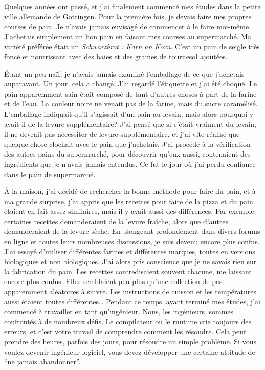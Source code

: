 Quelques années ont passé, et j'ai finalement commencé mes études dans la petite ville allemande de Göttingen.
Pour la première fois, je devais faire mes propres courses de pain. Je n'avais jamais
envisagé de commencer à le faire moi-même. J'achetais simplement
un bon pain en faisant mes courses au supermarché. Ma variété préférée
était un \emph{Schwarzbrot : Korn an Korn}. C'est un pain de seigle très foncé et nourrissant
avec des baies et des graines de tournesol ajoutées.

Étant un peu naïf, je n'avais jamais examiné l'emballage de ce que j'achetais
auparavant. Un jour, cela a changé. J'ai regardé l'étiquette et j'ai été choqué. Le
pain apparemment sain était composé de tant d'autres choses à part de la farine et de l'eau.
La couleur noire ne venait pas de la farine, mais du sucre caramélisé.
L'emballage indiquait qu'il s'agissait d'un pain au levain, mais alors pourquoi y avait-il de la levure supplémentaire?
J'ai pensé que si c'était vraiment du levain, il ne devrait pas nécessiter de levure supplémentaire, et j'ai vite
réalisé que quelque chose clochait avec le pain que j'achetais.
J'ai procédé à la vérification des autres pains du supermarché, pour découvrir qu'eux aussi,
contenaient des ingrédients que je n'avais jamais entendus. Ce fut le jour où j'ai perdu confiance
dans le pain de supermarché.

À la maison, j'ai décidé de rechercher la bonne méthode pour faire du pain, et à ma grande surprise,
j'ai appris que les recettes pour faire de la pizza et du pain étaient en fait assez similaires, mais
il y avait aussi des différences. Par exemple, certaines recettes demanderaient de la levure fraîche, alors
que d'autres demanderaient de la levure sèche. En plongeant profondément dans divers forums en ligne et toutes leurs nombreuses
discussions, je suis devenu encore plus confus.
J'ai essayé d'utiliser différentes farines et différentes marques, toutes en versions biologiques et non biologiques.
J'ai alors pris conscience que je ne savais rien sur la fabrication du pain. Les recettes contredisaient souvent chacune,
me laissant encore plus confus. Elles semblaient peu plus qu'une collection de pas apparemment aléatoires
à suivre. Les instructions de cuisson et les températures aussi étaient toutes
différentes\dots
Pendant ce temps, ayant terminé mes études, j'ai commencé à travailler en tant qu'ingénieur.
Nous, les ingénieurs, sommes confrontés à de nombreux défis. Le compilateur ou le runtime
crie toujours des erreurs, et c'est votre travail de comprendre comment les résoudre.
Cela peut prendre des heures, parfois des jours, pour résoudre un simple problème. Si vous voulez
devenir ingénieur logiciel, vous devez développer une certaine attitude de ``ne jamais abandonner''.

